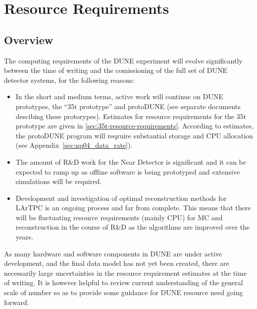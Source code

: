 \section{Resource Requirements}
\label{sec:resource-requirements}
\subsection{Overview}
The computing requirements of the DUNE experiment will evolve significantly between the time of writing
and the comissioning of the full set of DUNE detector systems, for the following reasons:
\begin{itemize}
\item In the short and medium terms, active work will continue on DUNE prototypes, the ``35t prototype'' and protoDUNE
(see separate documents descibing these protorypes). Estimates for resource requirements for the 35t
prototype are given in \ref{sec:35t-resource-requirements}. According to estimates, the protoDUNE program
will reqruire substantial storage and CPU allocation (see Appendix~\ref{sec:np04_data_rate}).

\item The amount of R\&D work for the Near Detector is significant and it can be expected to ramp up as offline software
is being prototyped and extensive simulations will be required.

\item Development and investigation of optimal reconstruction methods for LArTPC is an ongoing process and far from complete.
This means that there will be fluctuating resource requirements (mainly CPU) for MC and reconstruction in the course of R\&D
as the algorithms are improved over the years.

\end{itemize}

\noindent
As many hardware and software components in DUNE are under active development,
and the final data model has not yet been created, there are necessarily large uncertainties in the resource requirement estimates
at the time of writing. It is however helpful to review current understanding of the general scale of number so as to provide some
guidance for DUNE resource need going forward.



%

